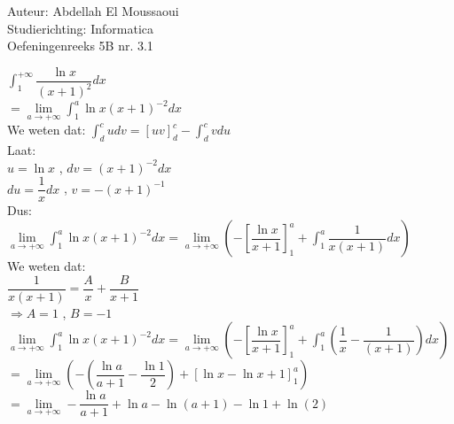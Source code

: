 \documentclass[a4paper]{article}
\begin{document}
  
\noindent \large Auteur: Abdellah El Moussaoui \\
\noindent \large Studierichting: Informatica\\
\noindent \large Oefeningenreeks 5B nr. 3.1\\

\medskip

\normalsize

$\displaystyle\int^{+\infty}_1\dfrac{\ln{x}}{\left(x+1\right)^2}dx$\\

$=\lim\limits_{a\to+\infty}\displaystyle\int^a_1\ln{x}\left(x+1\right)^{-2}dx$\\

We weten dat: $\displaystyle\int^c_dudv=\left[uv\right]^c_d-\displaystyle\int^c_dvdu$\\

Laat:\\

$u=\ln{x}$ , $dv=\left(x+1\right)^{-2}dx$\\

$du=\dfrac{1}{x}dx$ , $v=-\left(x+1\right)^{-1}$\\

Dus:\\

$\lim\limits_{a\to+\infty}\displaystyle\int^a_1\ln{x}\left(x+1\right)^{-2}dx = \lim\limits_{a\to+\infty} \left(-\left[\dfrac{\ln{x}}{x+1}\right]^a_1+\displaystyle\int^a_1\dfrac{1}{x\left(x+1\right)}dx\right)$\\

We weten dat:\\

$\dfrac{1}{x\left(x+1\right)} = \dfrac{A}{x}+\dfrac{B}{x+1}$\\

$\Rightarrow A=1$ , $B=-1$\\

$\lim\limits_{a\to+\infty}\displaystyle\int^a_1\ln{x}\left(x+1\right)^{-2}dx = \lim\limits_{a\to+\infty} \left(-\left[\dfrac{\ln{x}}{x+1}\right]^a_1+\displaystyle\int^a_1\left(\dfrac{1}{x}-\dfrac{1}{\left(x+1\right)}\right)dx\right)$\\

$= \lim\limits_{a\to+\infty} \left(-\left(\dfrac{\ln{a}}{a+1}-\dfrac{\ln{1}}{2}\right)+\left[\ln{x} - \ln{x+1} \right]^a_1\right)$\\

$= \lim\limits_{a\to+\infty} -\dfrac{\ln{a}}{a+1}+\ln{a} - \ln\left({a+1}\right) -\ln{1} + \ln\left({2}\right)$\\
\end{document}
